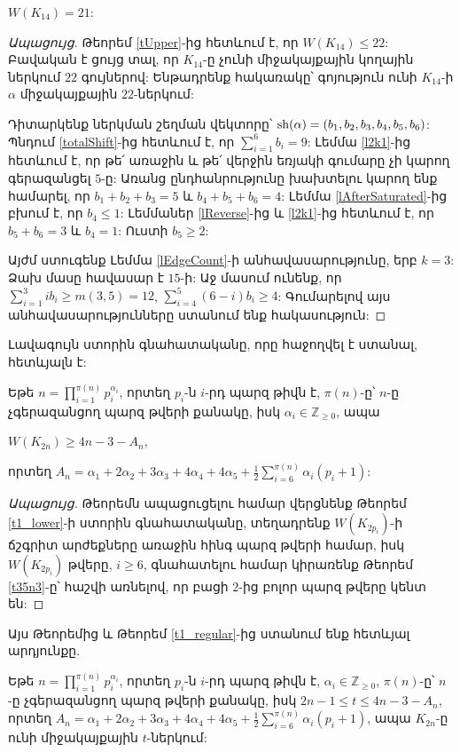 \begin{lemma}
\label{lK14}
$W(K_{14}) = 21$:
\end{lemma}
\begin{proof}[Ապացույց]
Թեորեմ \ref{tUpper}-ից հետևում է, որ $W(K_{14}) \leq 22$: Բավական է ցույց տալ, որ $K_{14}$-ը չունի միջակայքային կողային ներկում $22$ գույներով: Ենթադրենք հակառակը՝ գոյություն ունի $K_{14}$-ի $\alpha$ միջակայքային $22$-ներկում:

Դիտարկենք ներկման շեղման վեկտորը՝ ${\rm sh}(\alpha)=(b_1,b_2,b_3,b_4,b_5,b_6)$: Պնդում \ref{totalShift}-ից հետևում է, որ $\sum\limits_{i=1}^{6}{b_i}=9$: Լեմմա \ref{l2k1}-ից հետևում է, որ թե՛ առաջին և թե՛ վերջին եռյակի գումարը չի կարող գերազանցել $5$-ը: Առանց ընդհանրությունը խախտելու կարող ենք համարել, որ $b_1+b_2+b_3=5$ և $b_4+b_5+b_6=4$: Լեմմա \ref{lAfterSaturated}-ից բխում է, որ $b_4 \leq 1$: Լեմմաներ \ref{lReverse}-ից և \ref{l2k1}-ից հետևում է, որ $b_5+b_6=3$ և $b_4=1$: Ուստի $b_5 \geq 2$:

Այժմ ստուգենք Լեմմա \ref{lEdgeCount}-ի անհավասարությունը, երբ $k=3$: Ձախ մասը հավասար է $15$-ի: Աջ մասում ունենք, որ $\sum\limits_{i=1}^{3}{ib_i} \geq m(3,5) = 12$, $\sum\limits_{i=4}^{5}{(6-i)b_i} \geq 4$: Գումարելով այս անհավասարությունները ստանում ենք հակասություն:
\end{proof}

Լավագույն ստորին գնահատականը, որը հաջողվել է ստանալ, հետևյալն է: 

\begin{theorem}
\label{t1-complete-W-lower-best}
Եթե $n = \prod\limits_{i=1}^{\pi(n)}{p_i^{\alpha_i}}$, որտեղ $p_i$-ն $i$-րդ պարզ թիվն է, $\pi(n)$-ը՝ $n$-ը չգերազանցող պարզ թվերի քանակը, իսկ $\alpha_i \in \mathbb{Z}_{\geq 0}$, ապա
\begin{center}
$W(K_{2n}) \geq 4n - 3 - A_n$,
\end{center}
որտեղ $A_n = \alpha_1 + 2\alpha_2 + 3\alpha_3 + 4\alpha_4 + 4\alpha_5 + \frac{1}{2}\sum\limits_{i=6}^{\pi(n)}{\alpha_i(p_i+1)}$:
\end{theorem}
\begin{proof}[Ապացույց]
Թեորեմն ապացուցելու համար վերցնենք Թեորեմ \ref{t1_lower}-ի ստորին գնահատականը, տեղադրենք $W(K_{2p_i})$-ի ճշգրիտ արժեքները առաջին հինգ պարզ թվերի համար, իսկ $W(K_{2p_i})$ թվերը, $i\geq 6$, գնահատելու համար կիրառենք Թեորեմ \ref{t35n3}-ը՝ հաշվի առնելով, որ բացի $2$-ից բոլոր պարզ թվերը կենտ են:
\end{proof}

Այս Թեորեմից և Թեորեմ \ref{t1_regular}-ից ստանում ենք հետևյալ արդյունքը.
\begin{corollary}
Եթե $n = \prod\limits_{i=1}^{\pi(n)}{p_i^{\alpha_i}}$, որտեղ $p_i$-ն $i$-րդ պարզ թիվն է, $\alpha_i \in \mathbb{Z}_{\geq 0}$, $\pi(n)$-ը՝ $n$-ը չգերազանցող պարզ թվերի քանակը, իսկ $2n-1 \leq t \leq 4n - 3 - A_n$, որտեղ $A_n = \alpha_1 + 2\alpha_2 + 3\alpha_3 + 4\alpha_4 + 4\alpha_5 + \frac{1}{2}\sum\limits_{i=6}^{\pi(n)}{\alpha_i(p_i+1)}$, ապա $K_{2n}$-ը ունի միջակայքային $t$-ներկում:
\end{corollary}


